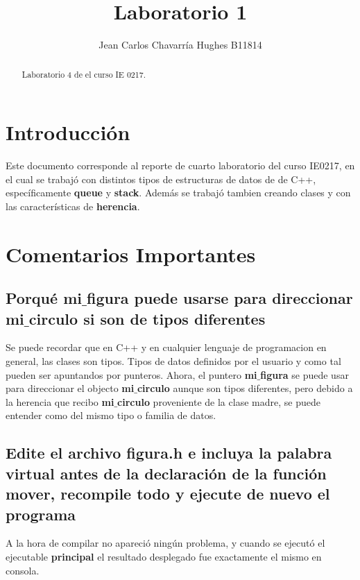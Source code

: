 \documentclass{article}
\begin{document}
\title{Laboratorio 1}
\author{Jean Carlos Chavarr\' ia Hughes B11814}
\maketitle
\begin{abstract}
Laboratorio 4 de el curso IE 0217.
\end{abstract}
\section{Introducci\' on}
Este documento corresponde al reporte de cuarto laboratorio del curso IE0217, en el cual se trabaj\' o con distintos tipos de estructuras de datos de de C++, espec\' ificamente \textbf{queue} y \textbf{stack}. 
Adem\' as se trabaj\' o tambien creando clases y con las caracter\' isticas de \textbf{herencia}.

\section{Comentarios Importantes}

\subsection{Porqu\' e mi$\_$figura puede usarse para direccionar mi$\_$circulo si son de tipos diferentes}

Se puede recordar que en C++ y en cualquier lenguaje de programacion en general, las clases son tipos. Tipos de datos definidos por el usuario y como tal pueden ser apuntandos por punteros.  Ahora, el puntero \textbf{mi$\_$figura} se puede usar para direccionar el objecto \textbf{mi$\_$circulo} aunque son tipos diferentes, pero debido a la herencia que recibo \textbf{mi$\_$circulo} proveniente de la clase madre, se puede entender como del mismo tipo o familia de datos.

\subsection{Edite el archivo figura.h e incluya la palabra virtual antes de la declaraci\' on de la funci\' on mover, recompile todo y ejecute de nuevo el programa}

A la hora de compilar no apareci\' o ning\' un problema, y cuando se ejecut\' o el ejecutable \textbf{principal}  el resultado desplegado fue exactamente el mismo en consola.
\end{document}
